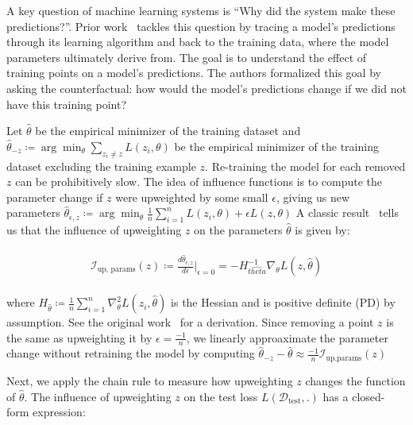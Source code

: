 A key question of machine learning systems is ``Why did the system make these predictions?''. 
Prior work~\cite{influence_fn} tackles this question by tracing a model's predictions through its learning algorithm and back to the training data, where the model parameters ultimately derive from.
The goal is to understand the effect of training points on a model's predictions. 
The authors formalized this goal by asking the counterfactual: how would the model's predictions change if we did not have this training point?

Let $\hat{\theta}$ be the empirical minimizer of the training dataset and %
$\hat{\theta}_{-z} \coloneqq \arg\min_\theta \sum_{z_i \neq z} L(z_i, \theta)$ be the empirical minimizer of the training dataset excluding the training example $z$.
Re-training the model for each removed $z$ can be prohibitively slow. 
The idea of influence functions is to compute the parameter change if $z$ were upweighted by some small $\epsilon$, giving us new parameters $\hat{\theta}_{\epsilon, z} \coloneqq \arg\min_\theta \frac{1}{n} \sum_{i=1}^n L(z_i, \theta) + \epsilon L(z, \theta)$
A classic result~\cite{influence_fn_book} tells us that the influence of upweighting $z$ on the parameters $\hat{\theta}$ is given by:


\begin{align*}
\begin{split}
     \mathcal{I}_\text{up, params}(z) \coloneqq \frac{d \hat{\theta}_{\epsilon, z}}{d \epsilon}\Bigr|_{\epsilon=0} = - H_{\hat{theta}}^{-1} \nabla_\theta L(z, \hat{\theta})
\end{split}
\end{align*}

\noindent where $H_{\hat{\theta}} \coloneqq \frac{1}{n} \sum_{i=1}^n \nabla_\theta^2 L(z_i, \hat{\theta})$ is the Hessian and is positive definite (PD) by assumption.
See the original work~\cite{influence_fn} for a derivation.
Since removing a point $z$ is the same as upweighting it by $\epsilon=\frac{-1}{n}$, we linearly approaximate the parameter change without retraining the model by computing $\hat{\theta}_{-z} - \hat{\theta} \approx \frac{-1}{n} \mathcal{I}_\text{up,params}(z)$

Next, we apply the chain rule to measure how upweighting $z$ changes the function of $\hat{\theta}$. 
The influence of upweighting $z$ on the test loss $L(\mathcal{D}_\text{test}, .)$ has a closed-form expression:



